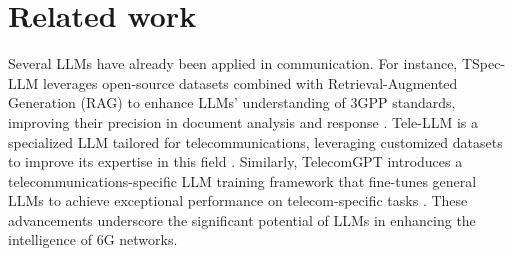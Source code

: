 \section{Related work}
Several LLMs have already been applied in communication. For instance, TSpec-LLM leverages open-source datasets combined with  Retrieval-Augmented Generation (RAG) to enhance LLMs’ understanding of 3GPP standards, improving their precision in document analysis and response \cite{nikbakht2024tspec}. Tele-LLM is a specialized LLM tailored for telecommunications, leveraging customized datasets to improve its expertise in this field \cite{RN17}. Similarly, TelecomGPT introduces a telecommunications-specific LLM training framework that fine-tunes general LLMs to achieve exceptional performance on telecom-specific tasks \cite{zou2024telecomgpt}. These advancements underscore the significant potential of LLMs in enhancing the intelligence of 6G networks.